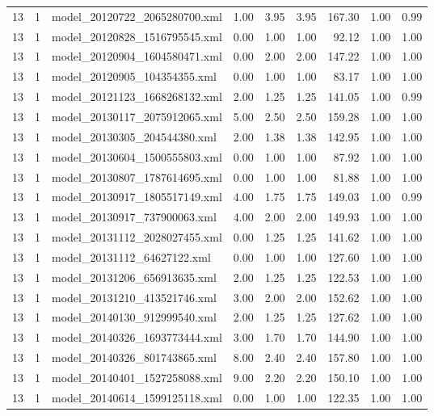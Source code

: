 \begin{table}[ht]
\begin{tabular}{rrlrrrrrr}
   13 &   1 & model\_20120722\_2065280700.xml & 1.00 & 3.95 & 3.95 & 167.30 & 1.00 & 0.99 \\ 
   13 &   1 & model\_20120828\_1516795545.xml & 0.00 & 1.00 & 1.00 & 92.12 & 1.00 & 1.00 \\ 
   13 &   1 & model\_20120904\_1604580471.xml & 0.00 & 2.00 & 2.00 & 147.22 & 1.00 & 1.00 \\ 
   13 &   1 & model\_20120905\_104354355.xml & 0.00 & 1.00 & 1.00 & 83.17 & 1.00 & 1.00 \\ 
   13 &   1 & model\_20121123\_1668268132.xml & 2.00 & 1.25 & 1.25 & 141.05 & 1.00 & 0.99 \\ 
   13 &   1 & model\_20130117\_2075912065.xml & 5.00 & 2.50 & 2.50 & 159.28 & 1.00 & 1.00 \\ 
   13 &   1 & model\_20130305\_204544380.xml & 2.00 & 1.38 & 1.38 & 142.95 & 1.00 & 1.00 \\ 
   13 &   1 & model\_20130604\_1500555803.xml & 0.00 & 1.00 & 1.00 & 87.92 & 1.00 & 1.00 \\ 
   13 &   1 & model\_20130807\_1787614695.xml & 0.00 & 1.00 & 1.00 & 81.88 & 1.00 & 1.00 \\ 
   13 &   1 & model\_20130917\_1805517149.xml & 4.00 & 1.75 & 1.75 & 149.03 & 1.00 & 0.99 \\ 
   13 &   1 & model\_20130917\_737900063.xml & 4.00 & 2.00 & 2.00 & 149.93 & 1.00 & 1.00 \\ 
   13 &   1 & model\_20131112\_2028027455.xml & 0.00 & 1.25 & 1.25 & 141.62 & 1.00 & 1.00 \\ 
   13 &   1 & model\_20131112\_64627122.xml & 0.00 & 1.00 & 1.00 & 127.60 & 1.00 & 1.00 \\ 
   13 &   1 & model\_20131206\_656913635.xml & 2.00 & 1.25 & 1.25 & 122.53 & 1.00 & 1.00 \\ 
   13 &   1 & model\_20131210\_413521746.xml & 3.00 & 2.00 & 2.00 & 152.62 & 1.00 & 1.00 \\ 
   13 &   1 & model\_20140130\_912999540.xml & 2.00 & 1.25 & 1.25 & 127.62 & 1.00 & 1.00 \\ 
   13 &   1 & model\_20140326\_1693773444.xml & 3.00 & 1.70 & 1.70 & 144.90 & 1.00 & 1.00 \\ 
   13 &   1 & model\_20140326\_801743865.xml & 8.00 & 2.40 & 2.40 & 157.80 & 1.00 & 1.00 \\ 
   13 &   1 & model\_20140401\_1527258088.xml & 9.00 & 2.20 & 2.20 & 150.10 & 1.00 & 1.00 \\ 
   13 &   1 & model\_20140614\_1599125118.xml & 0.00 & 1.00 & 1.00 & 122.35 & 1.00 & 1.00 \\ 

\end{tabular}
\end{table}
